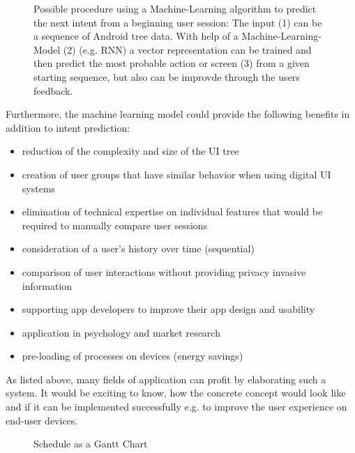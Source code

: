 \begin{figure}
  \centering
  
  \caption{Possible procedure using a Machine-Learning algorithm to predict the next intent from a beginning user session: The input (1) can be a sequence of Android tree data. With help of a Machine-Learning-Model (2) (e.g. RNN) a vector representation can be trained and then predict the most probable action or screen (3) from a given starting sequence, but also can be improvde through the users feedback.}
  \label{fig:encode-decode}
\end{figure}

Furthermore, the machine learning model could provide the following benefits in addition to intent prediction:
\begin{itemize}
  \item reduction of the complexity and size of the UI tree
  \item creation of user groups that have similar behavior when using digital UI systems \cite{jayarajah2015need}
  \item elimination of technical expertise on individual features that would be required to manually compare user sessions \cite{ghods2019activity2vec}
  \item consideration of a user's history over time (sequential)
  \item comparison of user interactions without providing privacy invasive information
  \item supporting app developers to improve their app design and usability
  \item application in psychology and market research
  \item pre-loading of processes on devices (energy savings) \cite{shen2019deepapp}
\end{itemize}

As listed above, many fields of application can profit by elaborating such a system. It would be exciting to know, how the concrete concept would look like and if it can be implemented successfully e.g. to improve the user experience on end-user devices.

\begin{figure}
  \centering
  
  \caption{Schedule as a Gantt Chart}
  \label{fig:schedule}
\end{figure}

